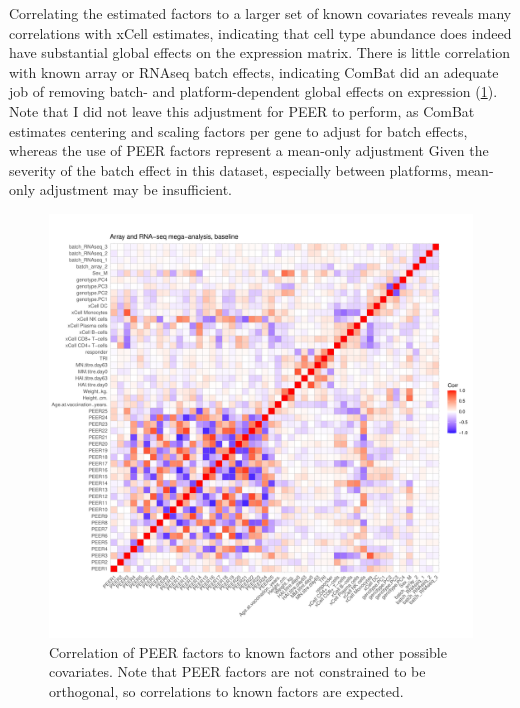 Correlating the estimated factors to a larger set of known covariates reveals many correlations with xCell estimates, indicating that cell type abundance does indeed have substantial global effects on the expression matrix.
There is little correlation with known array or \gls{RNAseq} batch effects, indicating ComBat did an adequate job of removing batch- and platform-dependent global effects on expression (\cref{fig:hird_peer_corMatrix_v2_mega}).
Note that I did not leave this adjustment for PEER to perform, as ComBat estimates centering and scaling factors per gene to adjust for batch effects, whereas the use of PEER factors represent a mean-only adjustment
Given the severity of the batch effect in this dataset, especially between platforms, mean-only adjustment may be insufficient\autocite{zhang2018AlternativeEmpiricalBayes}.

\begin{figure}
    \centering
    \includegraphics[width=1.0\textwidth,page=1]{mainmatter/figures/chapter_03/peer_plotting.mega_v2.pdf}
    \caption{Correlation of PEER factors to known factors and other possible covariates. Note that PEER factors are not constrained to be orthogonal, so correlations to known factors are expected.}
    \label{fig:hird_peer_corMatrix_v2_mega}
\end{figure}

